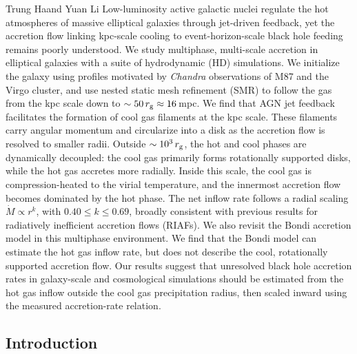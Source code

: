 {Trung Ha\footnotemark[1] and Yuan Li\footnotemark[1]}
{Low-luminosity active galactic nuclei regulate the hot atmospheres of massive elliptical galaxies through jet-driven feedback, yet the accretion flow linking kpc-scale cooling to event-horizon-scale black hole feeding remains poorly understood. We study multiphase, multi-scale accretion in elliptical galaxies with a suite of hydrodynamic (HD) simulations. We initialize the galaxy using profiles motivated by \textit{Chandra} observations of M87 and the Virgo cluster, and use nested static mesh refinement (SMR) to follow the gas from the kpc scale down to $\sim 50\,r_{\rm g} \approx 16$\,mpc. We find that AGN jet feedback facilitates the formation of cool gas filaments at the kpc scale. These filaments carry angular momentum and circularize into a disk as the accretion flow is resolved to smaller radii. Outside $\sim 10^3\,r_{\rm g}$, the hot and cool phases are dynamically decoupled: the cool gas primarily forms rotationally supported disks, while the hot gas accretes more radially. Inside this scale, the cool gas is compression-heated to the virial temperature, and the innermost accretion flow becomes dominated by the hot phase. The net inflow rate follows a radial scaling $\dot{M}\propto r^k$, with $0.40 \leq k \leq 0.69$, broadly consistent with previous results for radiatively inefficient accretion flows (RIAFs). We also revisit the Bondi accretion model in this multiphase environment. We find that the Bondi model can estimate the hot gas inflow rate, but does not describe the cool, rotationally supported accretion flow. Our results suggest that unresolved black hole accretion rates in galaxy-scale and cosmological simulations should be estimated from the hot gas inflow outside the cool gas precipitation radius, then scaled inward using the measured accretion-rate relation.}
{}
\setcounter{footnote}{0}

\subsection{Introduction}
\label{sec:agn-intro}

